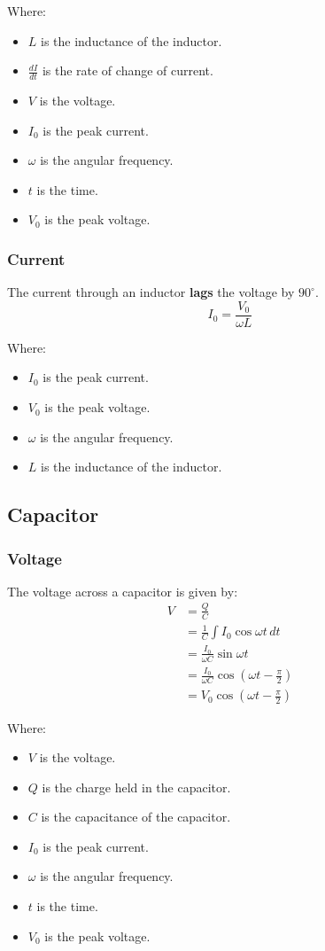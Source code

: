 \documentclass[11pt]{article}
\begin{document}
Where:
\begin{itemize}
\item \(L\) is the inductance of the inductor.
\item \(\frac{dI}{dt}\) is the rate of change of current.
\item \(V\) is the voltage.
\item \(I_0\) is the peak current.
\item \(\omega\) is the angular frequency.
\item \(t\) is the time.
\item \(V_0\) is the peak voltage.
\end{itemize}

\subsubsection{Current}
\label{sec:orge4d6b3e}
The current through an inductor \textbf{lags} the voltage by \(90^{\circ}\).
\[I_0 = \frac{V_0}{\omega L}\]

Where:
\begin{itemize}
\item \(I_0\) is the peak current.
\item \(V_0\) is the peak voltage.
\item \(\omega\) is the angular frequency.
\item \(L\) is the inductance of the inductor.
\end{itemize}

\subsection{Capacitor}
\label{sec:orge20c5ff}

\subsubsection{Voltage}
\label{sec:orgacdcdfa}
The voltage across a capacitor is given by:
\begin{align*}
V &= \frac{Q}{C} \\
&= \frac{1}{C} \int I_0 \cos \omega t \, dt \\
&= \frac{I_0}{\omega C} \sin \omega t \\
&= \frac{I_0}{\omega C} \cos \left(\omega t - \frac{\pi}{2} \right) \\
&= V_0 \cos \left( \omega t - \frac{\pi}{2} \right)
\end{align*}

Where:
\begin{itemize}
\item \(V\) is the voltage.
\item \(Q\) is the charge held in the capacitor.
\item \(C\) is the capacitance of the capacitor.
\item \(I_0\) is the peak current.
\item \(\omega\) is the angular frequency.
\item \(t\) is the time.
\item \(V_0\) is the peak voltage.
\end{itemize}
\end{document}
